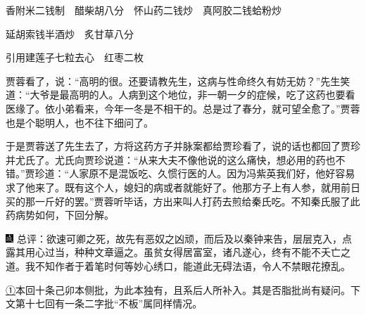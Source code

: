 香附米{二钱制}　醋柴胡{八分}　怀山药{二钱炒}　真阿胶{二钱蛤粉炒}

延胡索{钱半酒炒}　炙甘草{八分}

引用建莲子七粒去心　红枣二枚

贾蓉看了，说：``高明的很。还要请教先生，这病与性命终久有妨无妨？''先生笑道：``大爷是最高明的人。人病到这个地位，非一朝一夕的症候，吃了这药也要看医缘了。依小弟看来，今年一冬是不相干的。总是过了春分，就可望全愈了。''贾蓉也是个聪明人，也不往下细问了。

于是贾蓉送了先生去了，方将这药方子并脉案都给贾珍看了，说的话也都回了贾珍并尤氏了。尤氏向贾珍说道：``从来大夫不像他说的这么痛快，想必用的药也不错。''贾珍道：``人家原不是混饭吃、久惯行医的人。因为冯紫英我们好，他好容易求了他来了。既有这个人，媳妇的病或者就能好了。他那方子上有人参，就用前日买的那一斤好的罢。''贾蓉听毕话，方出来叫人打药去煎给秦氏吃。不知秦氏服了此药病势如何，下回分解。

{\includegraphics[width=3mm]{../Images/00005} \kaishu  总评：欲速可卿之死，故先有恶奴之凶顽，而后及以秦钟来告，层层克入，点露其用心过当，种种文章逼之。虽贫女得居富室，诸凡遂心，终有不能不夭亡之道。我不知作者于着笔时何等妙心绣口，能道此无碍法语，令人不禁眼花撩乱。}



{\href{../Text/part0014_split_000.html\#navto_1_a}{①}本回十条己卯本侧批，为此本独有，且系后人所补入。其是否脂批尚有疑问。下文第十七回有一条二字批``不板''属同样情况。}
